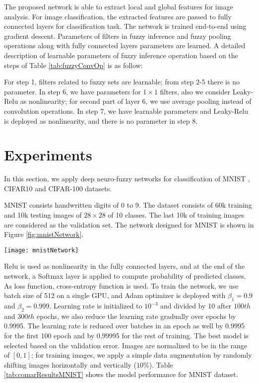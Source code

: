 \documentclass{article}
\begin{document}
The proposed network is able to extract local and global features for image analysis. For image classification, the extracted features are passed to fully connected layers for classification task. The network is trained end-to-end using gradient descent. Parameters of filters in fuzzy inference and fuzzy pooling operations along with fully connected layers parameters are learned. A detailed description of learnable parameters of fuzzy inference operation based on the steps of Table \ref{tab:fuzzyConvOp} is as follow:

For step 1, filters related to fuzzy sets are learnable; from step 2-5 there is no parameter. In step 6, we have parameters for $1 \times 1$ filters, also we consider Leaky-Relu \citep{xu2015empirical} as nonlinearity; for second part of layer 6, we use average pooling instead of convolution operations. In step 7, we have learnable parameters and Leaky-Relu is deployed as nonlinearity, and there is no parameter in step 8.

\section{Experiments}

In this section, we apply deep neuro-fuzzy networks for classification of MNIST \citep{lecun1998gradient}, CIFAR10 and CIFAR-100 \cite{krizhevsky2009learning} datasets. 

MNIST \citep{lecun1998gradient} consists handwritten digits of 0 to 9. The dataset consists of 60k training and 10k testing images of $28 \times 28$ of 10 classes. The last 10k of training images are considered as the validation set. The network designed for MNIST is shown in Figure \ref{fig:mnistNetwork}. 

\begin{figure*}[ht]
\vskip 0.2in
\begin{center}
\centerline{\texttt{[image: mnistNetwork]}}
\caption{Network designed for MNIST dataset}
\label{fig:mnistNetwork}
\end{center}
\vskip -0.2in
\end{figure*}

Relu is used as nonlinearity in the fully connected layers, and at the end of the network, a Softmax layer is applied to compute probability of predicted classes.  As loss function, cross-entropy function is used. To train the network, we use batch size of 512 on a single GPU, and Adam optimizer \cite{kingma2014adam} is deployed with $\beta_1= 0.9$ and $\beta_2= 0.999$. Learning rate is initialized to $10^{-3}$ and divided by 10 after $100th$ and $300th$ epochs, we also reduce the learning rate gradually over epochs by 0.9995. The learning rate is reduced over batches in an epoch as well by 0.9995 for the first 100 epoch and by 0.99995 for the rest of training. The best model is selected based on the validation error. Images are normalized to be in the range of $[0,1]$; for training images, we apply a simple data augmentation by randomly shifting images horizontally and vertically ($10\%$). Table \ref{tab:comarResultsMNIST} shows the model performance for MNIST dataset.
\end{document}
